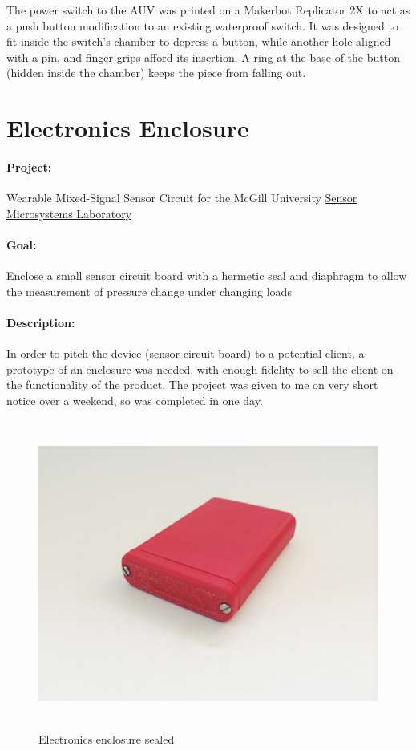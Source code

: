 \documentclass[12pt, landscape]{article}
\begin{document}
	The power switch to the AUV was printed on a Makerbot Replicator 2X to act as a push button modification to an existing waterproof switch.  It was designed to fit inside the switch's chamber to depress a button, while another hole aligned with a pin, and finger grips afford its insertion.  A ring at the base of the button (hidden inside the chamber) keeps the piece from falling out.

\clearpage

	\section{Electronics Enclosure}
		\paragraph{Project:} Wearable Mixed-Signal Sensor Circuit for the McGill University \href{http://www.ece.mcgill.ca/~vchoda/Research.htm}{Sensor Microsystems Laboratory}
		\paragraph{Goal:} Enclose a small sensor circuit board with a hermetic seal and diaphragm to allow the measurement of pressure change under changing loads
		\paragraph{Description:} In order to pitch the device (sensor circuit board) to a potential client, a prototype of an enclosure was needed, with enough fidelity to sell the client on the functionality of the product.  The project was given to me on very short notice over a weekend, so was completed in one day.

	\begin{figure}[H]
		\centering
		\includegraphics[height=4in]{media/enclosure_closed}
		\caption{Electronics enclosure sealed}
		\label{enclosure_sealed}
	\end{figure}
\end{document}
